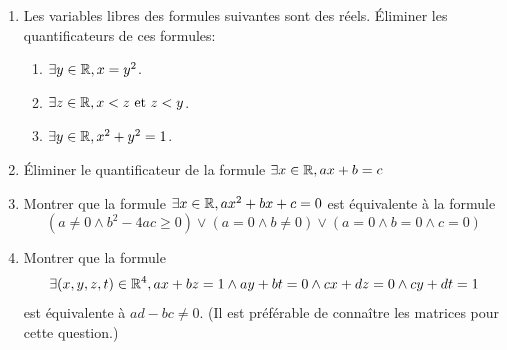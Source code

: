 \begin{exercice}
\begin{enumerate}
\item Les variables libres des formules suivantes sont des réels. Éliminer les quantificateurs de ces formules:
\begin{enumerate}
\item $\exists y\in\mathbb{R}, x=y^2$. %
\item $\exists z\in\mathbb{R}, x<z\text{ et } z<y$. %
\item $\exists y\in\mathbb{R}, x^2+y^2=1$. %
\end{enumerate}
\item Éliminer le quantificateur  de la formule $\exists x\in\mathbb{R}, ax+b=c$
\item Montrer que la formule $\exists x\in\mathbb{R}, ax^2+bx+c=0$ est équivalente à la formule
\[ (a\neq 0\land b^2-4ac\geq 0) \lor (a=0\land b\neq 0) \lor (a=0\land b=0\land c=0)\]
\item Montrer que la formule
\[ \exists(x,y,z,t)\in\mathbb{R}^4, ax+bz=1\land ay+bt=0 \land cx+dz=0\land cy+dt=1\]
est équivalente à $ad-bc\neq 0$. (Il est préférable de connaître les matrices pour cette question.)
\end{enumerate}
    
\end{exercice}